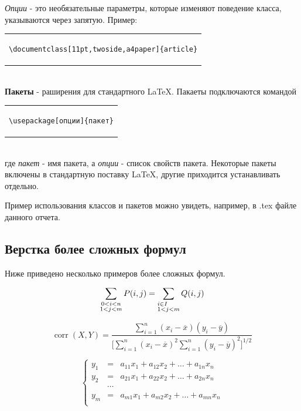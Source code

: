 \documentclass[10pt,a4paper,titlepage]{article}
\begin{document}
\textit{Опции} - это необязательные параметры, которые изменяют поведение класса, указываются через запятую. Пример:\\
\newline
\begin{tabular}{|p{12cm}|}
  \begin{verbatim}
\documentclass[11pt,twoside,a4paper]{article}
  \end{verbatim}
\end{tabular}\\
\newline
\textbf{Пакеты} - раширения для стандартного \LaTeX. Пакаеты подключаются командой\\
\newline
\begin{tabular}{|p{12cm}|}
  \begin{verbatim}
\usepackage[опции]{пакет}
  \end{verbatim}
\end{tabular}\\
\newline
где \textit{пакет} - имя пакета, а \textit{опции} - список свойств пакета. Некоторые пакеты включены в стандартную поставку \LaTeX, другие приходится устанавливать отдельно.

Пример использования классов и пакетов можно увидеть, например, в .tex файле данного отчета.

\subsection{Верстка более сложных формул}
Ниже приведено несколько примеров более сложных формул.

\begin{equation}
\label{eq:3}
\sum_{\substack{0<i<n \\ 1<j<m}}
P(i,j) =
\sum_{\begin{subarray}{l} i\in I\\
1<j<m
\end{subarray}} Q(i,j)
\end{equation}

\begin{equation}
\label{eq:4}
\mathop{\mathrm{corr}}(X,Y)=
\frac{\displaystyle
\sum_{i=1}^n(x_i-\overline x)
(y_i-\overline y)}
{\displaystyle\biggl[
\sum_{i=1}^n(x_i-\overline x)^2
\sum_{i=1}^n(y_i-\overline y)^2
\biggr]^{1/2}}
\end{equation}

\begin{equation}
\label{eq:5}
\left\{\begin{array}{rcl}y_1&=&a_{11}x_1 + a_{12}x_2 + \ldots + a_{1n}x_n\\
y_2&=&a_{21}x_1 + a_{22}x_2 + \ldots + a_{2n}x_n\\
& \cdots & \\
y_m&=&a_{m1}x_1 + a_{m2}x_2 + \ldots + a_{mn}x_n\\
\end{array}\right.
\end{equation}
\end{document}
